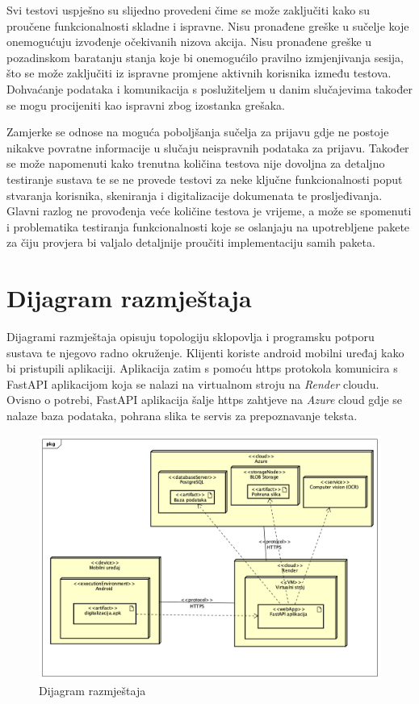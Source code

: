 			{Svi testovi uspješno su slijedno provedeni čime se može zaključiti kako su proučene funkcionalnosti skladne i ispravne. Nisu pronađene greške u sučelje koje onemogućuju izvođenje očekivanih nizova akcija. Nisu pronađene greške u pozadinskom baratanju stanja koje bi onemogućilo pravilno izmjenjivanja sesija, što se može zaključiti iz ispravne promjene aktivnih korisnika između testova. Dohvaćanje podataka i komunikacija s poslužiteljem u danim slučajevima također se mogu procijeniti kao ispravni zbog izostanka grešaka.}
				
			{Zamjerke se odnose na moguća poboljšanja sučelja za prijavu gdje ne postoje nikakve povratne informacije u slučaju neispravnih podataka za prijavu. Također se može napomenuti kako trenutna količina testova nije dovoljna za detaljno testiranje sustava te se ne provede testovi za neke ključne funkcionalnosti poput stvaranja korisnika, skeniranja i digitalizacije dokumenata te prosljeđivanja. Glavni razlog ne provođenja veće količine testova je vrijeme, a može se spomenuti i problematika testiranja funkcionalnosti koje se oslanjaju na upotrebljene pakete za čiju provjera bi valjalo detaljnije proučiti implementaciju samih paketa.}
			 
			\eject 
		
		
		\section{Dijagram razmještaja}
			
			 {Dijagrami razmještaja opisuju topologiju sklopovlja i programsku potporu sustava te njegovo radno okruženje. Klijenti koriste android mobilni uređaj kako bi pristupili aplikaciji. Aplikacija zatim s pomoću https protokola komunicira s FastAPI aplikacijom koja se nalazi na virtualnom stroju na \textit{Render} cloudu. Ovisno o potrebi, FastAPI aplikacija šalje https zahtjeve na \textit{Azure} cloud gdje se nalaze baza podataka, pohrana slika te servis za prepoznavanje teksta.}
			 
			 \begin{figure}[H]
			 	\includegraphics[width=\textwidth]{slike/dijagramRazmjestaja.png}
			 	\caption{Dijagram razmještaja}
			 	\label{fig:dijagramRazmjestaja}
			 \end{figure}		
			

